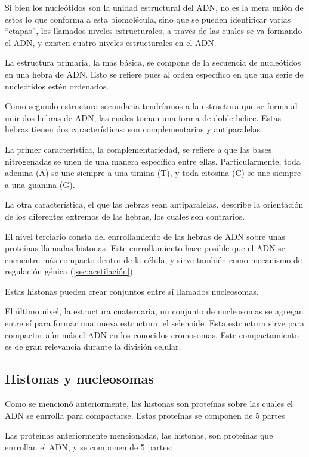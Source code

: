 Si bien los nucleótidos son la unidad estructural del ADN, no es la mera unión de estos lo que conforma a esta biomolécula, sino que se pueden identificar varias ``etapas'', los llamados niveles estructurales, a través de las cuales se va formando el ADN, y existen cuatro niveles estructurales en el ADN.

La estructura primaria, la más básica, se compone de la secuencia de nucleótidos en una hebra de ADN. Esto se refiere pues al orden específico en que una serie de nucleótidos estén ordenados.

Como segundo estructura secundaria tendríamos a la estructura que se forma al unir dos hebras de ADN, las cuales toman una forma de doble hélice. Estas hebras tienen dos características: son complementarias y antiparalelas.

La primer característica, la complementariedad, se refiere a que las bases nitrogenadas se unen de una manera específica entre ellas. Particularmente, toda adenina (A) se une siempre a una timina (T), y toda citosina (C) se une siempre a una guanina (G). 

La otra característica, el que las hebras sean antiparalelas, describe la orientación de los diferentes extremos de las hebras, los cuales son contrarios.

El nivel terciario consta del enrrollamiento de las hebras de ADN sobre unas proteínas llamadas histonas. Este enrrollamiento hace posible que el ADN se encuentre más compacto dentro de la célula, y sirve también como mecanismo de regulación génica (\autoref{sec:acetilación}).

Estas histonas pueden crear conjuntos entre sí llamados nucleosomas.

El último nivel, la estructura cuaternaria, un conjunto de nucleosomas se agregan entre sí para formar una nueva estructura, el selenoide. Esta estructura sirve para compactar aún más el ADN en los conocidos cromosomas. Este compactamiento es de gran relevancia durante la división celular.


\subsection{Histonas y nucleosomas}

Como se mencionó anteriormente, las histonas son proteínas sobre las cuales el ADN se enrrolla para compactarse. Estas proteínas se componen de 5 partes 

Las proteínas anteriormente mencionadas, las histonas, son proteínas que enrrollan el ADN, y se componen de 5 partes:

